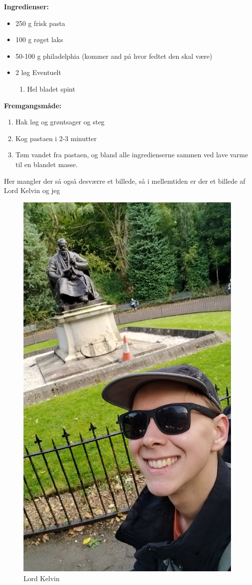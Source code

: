 \documentclass{book}
\begin{document}
\begin{minipage}[t] {0.5\textwidth}
\textbf{Ingredienser:}
    \begin{itemize}
        \item 250 g frisk pasta
        \item 100 g røget laks
        \item 50-100 g philadelphia (kommer and på hvor fedtet den skal være)
        \item 2 løg
        Eventuelt
        \begin{enumerate}
            \item Hel bladet spint
            
        \end{enumerate}
    \end{itemize}
\end{minipage}
\begin{minipage}[t] {0.5\textwidth}
 \textbf{Fremgangsmåde:}
 \begin{enumerate}
     \item Hak løg og grøntsager og steg
     \item Kog pastaen i 2-3 minutter
     \item Tøm vandet fra pastaen, og bland alle ingredienserne sammen ved lave varme til en blandet masse.
     
 \end{enumerate}
\end{minipage}
\newpage Her mangler der så også desværre et billede, så i mellemtiden er der et billede af Lord Kelvin og jeg
\begin{figure}
    \centering
    \includegraphics[width=0.5\linewidth]{Kelvin.jpg}
    \caption{Lord Kelvin }
\end{figure}
\end{document}
